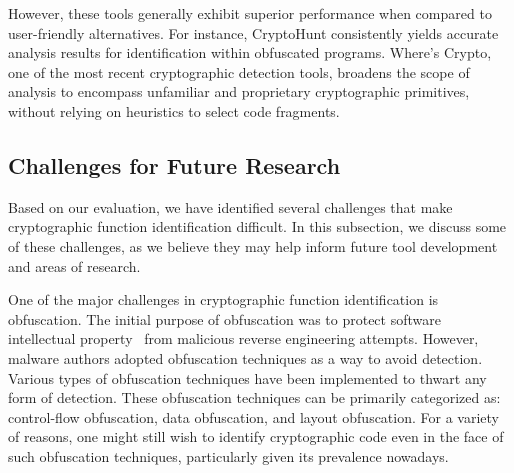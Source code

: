However, these tools generally exhibit superior performance when compared to user-friendly alternatives. For instance, CryptoHunt consistently yields accurate analysis results for identification within obfuscated programs. Where's Crypto, one of the most recent cryptographic detection tools, broadens the scope of analysis to encompass unfamiliar and proprietary cryptographic primitives, without relying on heuristics to select code fragments.

\subsection{Challenges for Future Research}
\label{subsec:challenges}

Based on our evaluation, we have identified several challenges that make cryptographic function identification difficult.
In this subsection, we discuss some of these challenges, as we believe they may help inform future tool development and areas of research.

 One of the major challenges in cryptographic function identification is obfuscation.
The initial purpose of obfuscation was to protect software intellectual
property~\cite{collberg1997taxonomy} from malicious reverse engineering
attempts. However, malware authors adopted obfuscation techniques as a way to
avoid detection. Various types of obfuscation techniques have been implemented
to thwart any form of detection. These obfuscation techniques can be primarily
categorized as: control-flow obfuscation, data obfuscation, and layout obfuscation.
For a variety of reasons, one might still wish to identify cryptographic code
even in the face of such obfuscation techniques, particularly given its prevalence nowadays.

